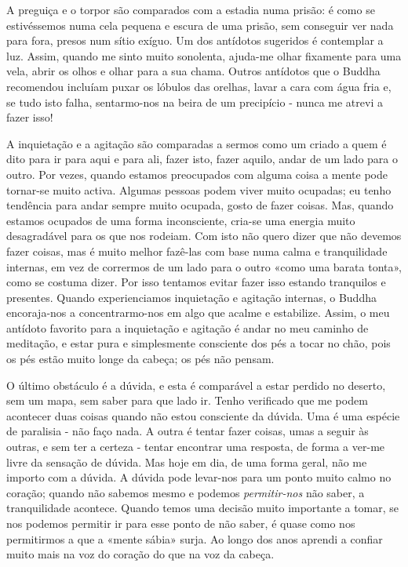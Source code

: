 A preguiça e o torpor são comparados com a estadia numa prisão: é como
se estivéssemos numa cela pequena e escura de uma prisão, sem conseguir
ver nada para fora, presos num sítio exíguo. Um dos antídotos sugeridos
é contemplar a luz. Assim, quando me sinto muito sonolenta, ajuda-me
olhar fixamente para uma vela, abrir os olhos e olhar para a sua chama.
Outros antídotos que o Buddha recomendou incluíam puxar os lóbulos das
orelhas, lavar a cara com água fria e, se tudo isto falha, sentarmo-nos
na beira de um precipício - nunca me atrevi a fazer isso!

A inquietação e a agitação são comparadas a sermos como um criado a quem
é dito para ir para aqui e para ali, fazer isto, fazer aquilo, andar de
um lado para o outro. Por vezes, quando estamos preocupados com alguma
coisa a mente pode tornar-se muito activa. Algumas pessoas podem viver
muito ocupadas; eu tenho tendência para andar sempre muito ocupada,
gosto de fazer coisas. Mas, quando estamos ocupados de uma forma
inconsciente, cria-se uma energia muito desagradável para os que nos
rodeiam. Com isto não quero dizer que não devemos fazer coisas, mas é
muito melhor fazê-las com base numa calma e tranquilidade internas, em
vez de corrermos de um lado para o outro «como uma barata tonta», como
se costuma dizer. Por isso tentamos evitar fazer isso estando tranquilos
e presentes. Quando experienciamos inquietação e agitação internas, o
Buddha encoraja-nos a concentrarmo-nos em algo que acalme e estabilize.
Assim, o meu antídoto favorito para a inquietação e agitação é andar no
meu caminho de meditação, e estar pura e simplesmente consciente dos pés
a tocar no chão, pois os pés estão muito longe da cabeça; os pés não
pensam.

O último obstáculo é a dúvida, e esta é comparável a estar perdido no
deserto, sem um mapa, sem saber para que lado ir. Tenho verificado que
me podem acontecer duas coisas quando não estou consciente da dúvida.
Uma é uma espécie de paralisia - não faço nada. A outra é tentar fazer
coisas, umas a seguir às outras, e sem ter a certeza - tentar encontrar
uma resposta, de forma a ver-me livre da sensação de dúvida. Mas hoje em
dia, de uma forma geral, não me importo com a dúvida. A dúvida pode
levar-nos para um ponto muito calmo no coração; quando não sabemos mesmo
e podemos \emph{permitir-nos} não saber, a tranquilidade acontece.
Quando temos uma decisão muito importante a tomar, se nos podemos
permitir ir para esse ponto de não saber, é quase como nos permitirmos a
que a «mente sábia» surja. Ao longo dos anos aprendi a confiar muito
mais na voz do coração do que na voz da cabeça.

